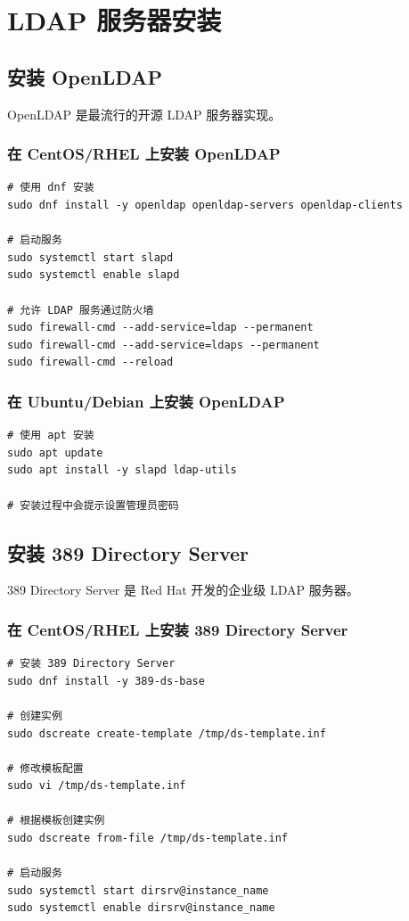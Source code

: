 \documentclass[12pt,UTF8]{ctexbook}
\begin{document}
\chapter{LDAP 服务器安装}
\label{chap:ldap_install}

\section{安装 OpenLDAP}
\label{sec:install_openldap}

OpenLDAP 是最流行的开源 LDAP 服务器实现。

\subsection{在 CentOS/RHEL 上安装 OpenLDAP}

\begin{verbatim}
# 使用 dnf 安装
sudo dnf install -y openldap openldap-servers openldap-clients

# 启动服务
sudo systemctl start slapd
sudo systemctl enable slapd

# 允许 LDAP 服务通过防火墙
sudo firewall-cmd --add-service=ldap --permanent
sudo firewall-cmd --add-service=ldaps --permanent
sudo firewall-cmd --reload
\end{verbatim}

\subsection{在 Ubuntu/Debian 上安装 OpenLDAP}

\begin{verbatim}
# 使用 apt 安装
sudo apt update
sudo apt install -y slapd ldap-utils

# 安装过程中会提示设置管理员密码
\end{verbatim}

\section{安装 389 Directory Server}
\label{sec:install_389ds}

389 Directory Server 是 Red Hat 开发的企业级 LDAP 服务器。

\subsection{在 CentOS/RHEL 上安装 389 Directory Server}

\begin{verbatim}
# 安装 389 Directory Server
sudo dnf install -y 389-ds-base

# 创建实例
sudo dscreate create-template /tmp/ds-template.inf

# 修改模板配置
sudo vi /tmp/ds-template.inf

# 根据模板创建实例
sudo dscreate from-file /tmp/ds-template.inf

# 启动服务
sudo systemctl start dirsrv@instance_name
sudo systemctl enable dirsrv@instance_name
\end{verbatim}
\end{document}
